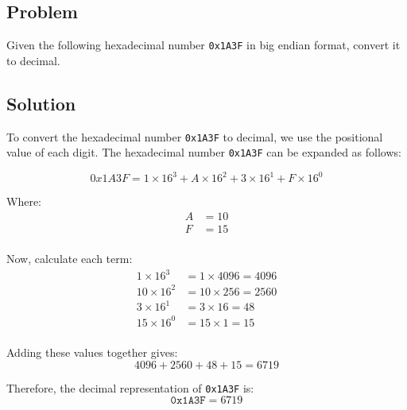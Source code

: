 \subsection*{Problem}
Given the following hexadecimal number \texttt{0x1A3F} in big endian format, convert it to decimal.

\subsection*{Solution}
To convert the hexadecimal number \texttt{0x1A3F} to decimal, we use the positional value of each digit. The hexadecimal number \texttt{0x1A3F} can be expanded as follows:

\[
0x1A3F = 1 \times 16^3 + A \times 16^2 + 3 \times 16^1 + F \times 16^0
\]

Where:
\begin{align*}
A & = 10 \\
F & = 15 \\
\end{align*}

Now, calculate each term:
\begin{align*}
1 \times 16^3 & = 1 \times 4096 = 4096 \\
10 \times 16^2 & = 10 \times 256 = 2560 \\
3 \times 16^1 & = 3 \times 16 = 48 \\
15 \times 16^0 & = 15 \times 1 = 15 \\
\end{align*}

Adding these values together gives:
\[
4096 + 2560 + 48 + 15 = 6719
\]

Therefore, the decimal representation of \texttt{0x1A3F} is:
\[
\texttt{0x1A3F} = 6719
\]